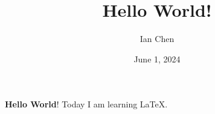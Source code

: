 \documentclass{article}
\title{Hello World!}
\author{Ian Chen}
\date{June 1, 2024}
\begin{document}
\maketitle
\textbf{Hello World}! Today I am learning \LaTeX.
\end{document}

